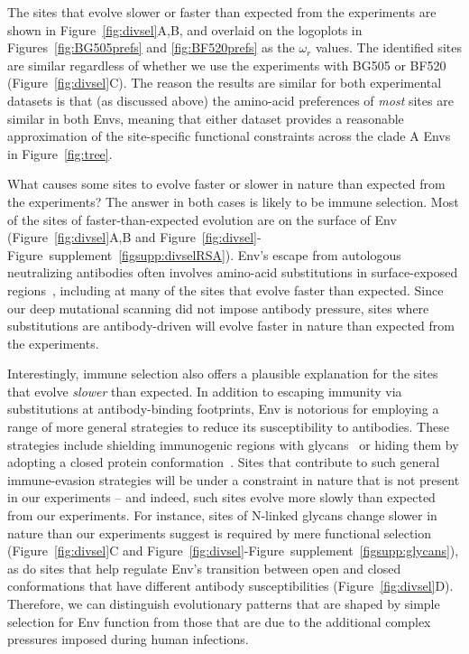 \documentclass[9pt]{elife}
\begin{document}
The sites that evolve slower or faster than expected from the experiments are shown in Figure~\ref{fig:divsel}A,B, and overlaid on the logoplots in Figures~\ref{fig:BG505prefs} and \ref{fig:BF520prefs} as the $\omega_r$ values.
The identified sites are similar regardless of whether we use the experiments with BG505 or BF520 (Figure~\ref{fig:divsel}C).
The reason the results are similar for both experimental datasets is that (as discussed above) the amino-acid preferences of \emph{most} sites are similar in both Envs, meaning that either dataset provides a reasonable approximation of the site-specific functional constraints across the clade A Envs in Figure~\ref{fig:tree}.

What causes some sites to evolve faster or slower in nature than expected from the experiments?
The answer in both cases is likely to be immune selection.
Most of the sites of faster-than-expected evolution are on the surface of Env (Figure~\ref{fig:divsel}A,B and Figure~\ref{fig:divsel}-Figure~supplement~\ref{figsupp:divselRSA}).
Env's escape from autologous neutralizing antibodies often involves amino-acid substitutions in surface-exposed regions~\citep{moore2009specificity}, including at many of the sites that evolve faster than expected.
Since our deep mutational scanning did not impose antibody pressure, sites where substitutions are antibody-driven will evolve faster in nature than expected from the experiments.

Interestingly, immune selection also offers a plausible explanation for the sites that evolve \emph{slower} than expected.
In addition to escaping immunity via substitutions at antibody-binding footprints, Env is notorious for employing a range of more general strategies to reduce its susceptibility to antibodies.
These strategies include shielding immunogenic regions with glycans~\citep{wei2003antibody,stewart2016trimeric} or hiding them by adopting a closed protein conformation~\citep{kwong2002hiv,guttman2015antibody,ozorowski2017open}.
Sites that contribute to such general immune-evasion strategies will be under a constraint in nature that is not present in our experiments -- and indeed, such sites evolve more slowly than expected from our experiments.
For instance, sites of N-linked glycans change slower in nature than our experiments suggest is required by mere functional selection (Figure~\ref{fig:divsel}C and Figure~\ref{fig:divsel}-Figure~supplement~\ref{figsupp:glycans}), as do sites that help regulate Env's transition between open and closed conformations that have different antibody susceptibilities (Figure~\ref{fig:divsel}D).
Therefore, we can distinguish evolutionary patterns that are shaped by simple selection for Env function from those that are due to the additional complex pressures imposed during human infections. 
\end{document}
